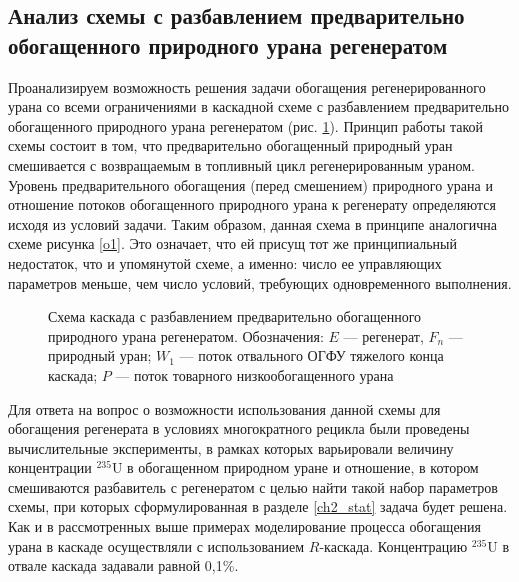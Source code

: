 \subsection{Анализ схемы с разбавлением предварительно обогащенного природного урана регенератом}\label{sw_method}

Проанализируем возможность решения задачи обогащения регенерированного урана со всеми ограничениями в каскадной схеме с разбавлением предварительно обогащенного природного урана регенератом (рис. \ref{o2}). Принцип работы такой схемы состоит в том, что предварительно обогащенный природный уран смешивается с возвращаемым в топливный цикл регенерированным ураном. Уровень предварительного обогащения (перед смешением) природного урана и отношение потоков обогащенного природного урана к регенерату определяются исходя из условий задачи. Таким образом, данная схема в принципе аналогична схеме рисунка \ref{o1}. Это означает, что ей присущ тот же принципиальный недостаток, что и упомянутой схеме, а именно: число ее управляющих параметров меньше, чем число условий, требующих одновременного выполнения. 

\begin{figure}[ht]
  \caption{Схема каскада с разбавлением предварительно обогащенного природного урана регенератом. Обозначения: $E$ --- регенерат, $F_n$ --- природный уран; $W_1$ --- поток отвального ОГФУ тяжелого конца каскада; $P$ --- поток товарного низкообогащенного урана}\label{o2}
\end{figure}

Для ответа на вопрос о возможности использования данной схемы для обогащения регенерата в условиях многократного рецикла были проведены вычислительные эксперименты, в рамках которых варьировали величину концентрации $^{235}$U в обогащенном природном уране и отношение, в котором смешиваются разбавитель с регенератом с целью найти такой набор параметров схемы, при которых сформулированная в разделе \ref{ch2_stat} задача будет решена. Как и в рассмотренных выше примерах моделирование процесса обогащения урана в каскаде осуществляли с использованием $R$-каскада. Концентрацию $^{235}$U в отвале каскада задавали равной 0,1\%.

